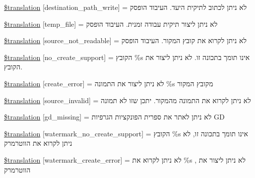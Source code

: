 \begin{DoxyCompactItemize}
\item 
\hyperlink{class_8upload_8he___i_l_8php_a40e4e1962226b89fd76da5819a9602b0}{\$translation} \mbox{[}\textquotesingle{}destination\+\_\+path\+\_\+write\textquotesingle{}\mbox{]} = \textquotesingle{}לא ניתן לכתוב לתיקית היעד. העיבוד הופסק\textquotesingle{}
\item 
\hyperlink{class_8upload_8he___i_l_8php_a2baece8da11e20d45175db91851ec3e3}{\$translation} \mbox{[}\textquotesingle{}temp\+\_\+file\textquotesingle{}\mbox{]} = \textquotesingle{}לא ניתן ליצור תיקית עבודה זמנית. העיבוד הופסק\textquotesingle{}
\item 
\hyperlink{class_8upload_8he___i_l_8php_a922967ca2df0efdd455261142d8e5715}{\$translation} \mbox{[}\textquotesingle{}source\+\_\+not\+\_\+readable\textquotesingle{}\mbox{]} = \textquotesingle{}לא ניתן לקרוא את קובץ המקור. העיבוד הופסק\textquotesingle{}
\item 
\hyperlink{class_8upload_8he___i_l_8php_a346dfd1ade29f583dd20d345c436859f}{\$translation} \mbox{[}\textquotesingle{}no\+\_\+create\+\_\+support\textquotesingle{}\mbox{]} = \textquotesingle{}הקובץ \%s אינו תומך בתכונה זו. לא ניתן ליצור את הקובץ.\textquotesingle{}
\item 
\hyperlink{class_8upload_8he___i_l_8php_a53013ce9255c4e1849098ddd9fdb2b3f}{\$translation} \mbox{[}\textquotesingle{}create\+\_\+error\textquotesingle{}\mbox{]} = \textquotesingle{}לא ניתן ליצור את התמונה \%s מקובץ המקור\textquotesingle{}
\item 
\hyperlink{class_8upload_8he___i_l_8php_a6ab0a660b457eaf2d3434b225449fdd6}{\$translation} \mbox{[}\textquotesingle{}source\+\_\+invalid\textquotesingle{}\mbox{]} = \textquotesingle{}לא ניתן לקרוא את התמונה מהמקור. יתכן שזו לא תמונה\textquotesingle{}
\item 
\hyperlink{class_8upload_8he___i_l_8php_a7f3dfcc0db4bbc0f2e7210c439798e56}{\$translation} \mbox{[}\textquotesingle{}gd\+\_\+missing\textquotesingle{}\mbox{]} = \textquotesingle{}לא ניתן לאתר את ספרית הפונקציות הגרפיות G\+D\textquotesingle{}
\item 
\hyperlink{class_8upload_8he___i_l_8php_a82d5853430ab72dc1f9799ec36144cc6}{\$translation} \mbox{[}\textquotesingle{}watermark\+\_\+no\+\_\+create\+\_\+support\textquotesingle{}\mbox{]} = \textquotesingle{}הקובץ \%s אינו תומך בתכונה זו, לא ניתן לקרוא את הווטרמרק\textquotesingle{}
\item 
\hyperlink{class_8upload_8he___i_l_8php_aabca0b65dadbc6184415c16375f284ca}{\$translation} \mbox{[}\textquotesingle{}watermark\+\_\+create\+\_\+error\textquotesingle{}\mbox{]} = \textquotesingle{}לא ניתן לקרוא את \%s , לא ניתן ליצור את הווטרמרק\textquotesingle{}

\end{DoxyCompactItemize}
